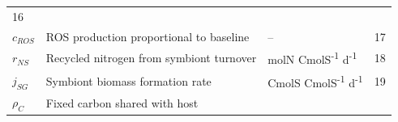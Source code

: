 \documentclass[]{elsarticle} %
\begin{document}
\begin{longtable}[c]{@{}llll@{}}
\begin{minipage}[t]{0.10\columnwidth}
16
\strut\end{minipage}\tabularnewline
\begin{minipage}[t]{0.10\columnwidth}\raggedright\strut
\(c_{ROS}\)
\strut\end{minipage} &
\begin{minipage}[t]{0.48\columnwidth}\raggedright\strut
ROS production proportional to baseline
\strut\end{minipage} &
\begin{minipage}[t]{0.25\columnwidth}\raggedright\strut
--
\strut\end{minipage} &
\begin{minipage}[t]{0.10\columnwidth}\raggedright\strut
17
\strut\end{minipage}\tabularnewline
\begin{minipage}[t]{0.10\columnwidth}\raggedright\strut
\(r_{NS}\)
\strut\end{minipage} &
\begin{minipage}[t]{0.48\columnwidth}\raggedright\strut
Recycled nitrogen from symbiont turnover
\strut\end{minipage} &
\begin{minipage}[t]{0.25\columnwidth}\raggedright\strut
molN CmolS\textsuperscript{-1} d\textsuperscript{-1}
\strut\end{minipage} &
\begin{minipage}[t]{0.10\columnwidth}\raggedright\strut
18
\strut\end{minipage}\tabularnewline
\begin{minipage}[t]{0.10\columnwidth}\raggedright\strut
\(j_{SG}\)
\strut\end{minipage} &
\begin{minipage}[t]{0.48\columnwidth}\raggedright\strut
Symbiont biomass formation rate
\strut\end{minipage} &
\begin{minipage}[t]{0.25\columnwidth}\raggedright\strut
CmolS CmolS\textsuperscript{-1} d\textsuperscript{-1}
\strut\end{minipage} &
\begin{minipage}[t]{0.10\columnwidth}\raggedright\strut
19
\strut\end{minipage}\tabularnewline
\begin{minipage}[t]{0.10\columnwidth}\raggedright\strut
\(\rho_C\)
\strut\end{minipage} &
\begin{minipage}[t]{0.48\columnwidth}\raggedright\strut
Fixed carbon shared with host
\strut\end{minipage} &

\end{longtable}
\end{document}
